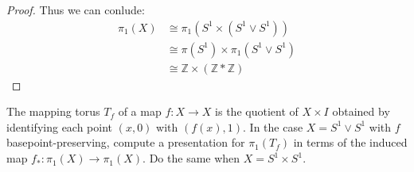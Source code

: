 \documentclass[12pt]{article}
\newenvironment{statement}[2][Statement]{\begin{trivlist}
\item[\hskip \labelsep {\bfseries #1}\hskip \labelsep {\bfseries #2.}]}{\end{trivlist}}
\begin{document}
\begin{proof}
  \par Thus we can conlude:
  \begin{align*}
    \pi_1(X) & \cong \pi_1(S^1 \times (S^1 \vee S^1)) \\
             & \cong \pi(S^1) \times \pi_1(S^1 \vee S^1) \\
             & \cong \mathbb{Z} \times (\mathbb{Z} \ast \mathbb{Z})
  \end{align*}
\end{proof}

\begin{statement}[Problem]{5}
 The mapping torus $T_f$ of a map $f:X \to X$ is the quotient of $X \times I$ 
 obtained by identifying each point $(x,0)$ with $(f(x),1)$. In the case $X = S^1 \vee S^1$ with $f$ basepoint-preserving,
 compute a presentation for $\pi_1(T_f)$ in terms of the induced map $f_*: \pi_1(X) \to \pi_1(X)$. Do the same when $X = S^1 \times S^1$.
\end{statement}
\end{document}
